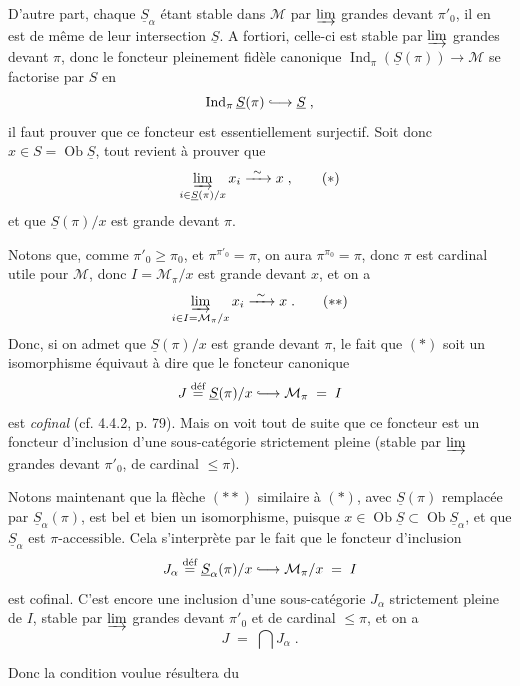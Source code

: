 \documentclass[11pt]{article}
\newcommand{\printedpage}[1]{\marginpar{\footnotesize p.~#1}}
\newcommand{\msp}[1]{\marginpar{\footnotesize [#1]}}
\newcommand{\incl}{\lhook\joinrel\longrightarrow}
\newcommand{\Ob}{\operatorname{Ob}}
\newcommand{\Ind}{\operatorname{Ind}}
\begin{document}
\printedpage{109}

D'autre part, chaque $\underline{S}_\alpha$ étant stable dans $\mathcal{M}$ par $\varinjlim$ grandes devant $\pi'_0$, il en est de même de leur intersection $\underline{S}$. A fortiori, celle-ci est stable par $\varinjlim$ grandes devant $\pi$, donc le foncteur pleinement fidèle canonique $\Ind_\pi(\underline{S}(\pi))\longrightarrow\mathcal{M}$ se factorise par $S$ en
\[ \Ind_\pi\underline{S}(\pi) \incl \underline{S} \; , \]
il faut prouver que ce foncteur est essentiellement surjectif. Soit donc $x\in S=\Ob\underline{S}$, tout revient à prouver que
\[ \varinjlim_{i\in\underline{S}(\pi)/x} x_i \xrightarrow{\ \sim\ } x \; , \tag*{$(*)$} \]
et que $\underline{S}(\pi)/x$ est grande devant $\pi$.

Notons que, comme $\pi'_0\geqslant\pi_0$, et $\pi^{\pi'_0}=\pi$, on aura $\pi^{\pi_0}=\pi$, donc $\pi$ est cardinal utile pour $\mathcal{M}$, donc $I=\mathcal{M}_\pi/x$ est grande devant $x$, et on a %
\[ \varinjlim_{i\in I=\mathcal{M}_\pi/x} x_i \xrightarrow{\ \sim\ } x \; . \tag*{$(**)$} \]
Donc, si on admet que $\underline{S}(\pi)/x$ est grande devant $\pi$,
\msp{page 294}
le fait que $(*)$ soit un isomorphisme équivaut à dire que le foncteur canonique
\[ J \overset{\text{déf}}{=} \underline{S}(\pi)/x \incl \mathcal{M}_\pi \; = \; I \] %
est \textit{cofinal} (cf. 4.4.2, p. 79). Mais on voit tout de suite que ce foncteur est un foncteur d'inclusion d'une sous-catégorie strictement pleine (stable par $\varinjlim$ grandes devant $\pi'_0$, de cardinal $\leqslant\pi$).

Notons maintenant que la flèche $(**)$ similaire à $(*)$, avec $\underline{S}(\pi)$ remplacée par $\underline{S}_\alpha(\pi)$, est bel et bien un isomorphisme, puisque $x\in\Ob\underline{S}\subset\Ob\underline{S}_\alpha$, et que $\underline{S}_\alpha$ est $\pi$-accessible. Cela s'interprète par le fait que le foncteur d'inclusion
\[ J_\alpha \overset{\text{déf}}{=} \underline{S}_\alpha(\pi)/x \incl \mathcal{M}_\pi/x \; = \; I \]
est cofinal. C'est encore une inclusion d'une sous-catégorie $J_\alpha$ strictement pleine de $I$, stable par $\varinjlim$ grandes devant $\pi'_0$ et de cardinal $\leqslant\pi$, et on a
\[ J \; = \; \bigcap J_\alpha \; . \]

Donc la condition voulue résultera du
\msp{page 295}
\end{document}
